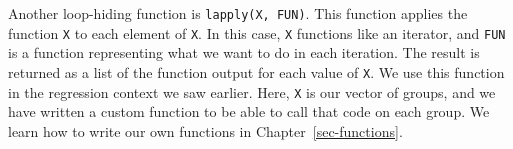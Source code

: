 \documentclass[
  letterpaper,
]{latex/krantz}
\makeatletter
\newenvironment{Shaded}{\begin{snugshade}}{\end{snugshade}}
\newcommand{\AttributeTok}[1]{\textcolor[rgb]{0.40,0.45,0.13}{#1}}
\newcommand{\CommentTok}[1]{\textcolor[rgb]{0.37,0.37,0.37}{#1}}
\newcommand{\ControlFlowTok}[1]{\textcolor[rgb]{0.00,0.23,0.31}{#1}}
\newcommand{\DecValTok}[1]{\textcolor[rgb]{0.68,0.00,0.00}{#1}}
\newcommand{\FunctionTok}[1]{\textcolor[rgb]{0.28,0.35,0.67}{#1}}
\newcommand{\NormalTok}[1]{\textcolor[rgb]{0.00,0.23,0.31}{#1}}
\newcommand{\OtherTok}[1]{\textcolor[rgb]{0.00,0.23,0.31}{#1}}
\newcommand{\SpecialCharTok}[1]{\textcolor[rgb]{0.37,0.37,0.37}{#1}}
\newenvironment{kframe}{%
\medskip{}
\setlength{\fboxsep}{.8em}
 \def\at@end@of@kframe{}%
 \ifinner\ifhmode%
  \def\at@end@of@kframe{\end{minipage}}%
  \begin{minipage}{\columnwidth}%
 \fi\fi%
 \def\FrameCommand##1{\hskip\@totalleftmargin \hskip-\fboxsep
 \colorbox{shadecolor}{##1}\hskip-\fboxsep
     \hskip-\linewidth \hskip-\@totalleftmargin \hskip\columnwidth}%
 \MakeFramed {\advance\hsize-\width
   \@totalleftmargin\z@ \linewidth\hsize
   \@setminipage}}%
 {\par\unskip\endMakeFramed%
 \at@end@of@kframe}
\renewenvironment{Shaded}{\begin{kframe}}{\end{kframe}}
\makeatother
\begin{document}
Another loop-hiding function is
\texttt{lapply(X,\ FUN)}.
This function applies the function \texttt{X} to each element of
\texttt{X}. In this case, \texttt{X} functions like an iterator, and
\texttt{FUN} is a function representing what we want to do in each
iteration. The result is returned as a list of the function output for
each value of \texttt{X}. We use this function in the regression context
we saw earlier. Here, \texttt{X} is our vector of groups, and we have
written a custom function to be able to call that code on each group. We
learn how to write our own functions in Chapter~\ref{sec-functions}.

\begin{Shaded}
\end{Shaded}
\end{document}
